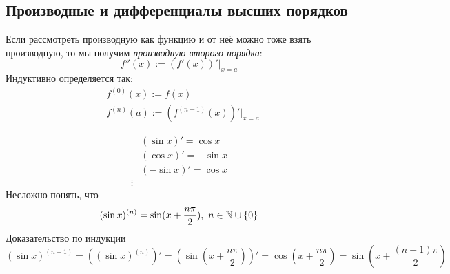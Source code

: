 
\subsection{Производные и дифференциалы высших порядков}

\begin{definition}
	Если рассмотреть производную как функцию и от неё можно тоже взять производную, то мы получим \textit{производную второго порядка}:
	$$
		f''(x) := (f'(x))' \big|_{x = a}
	$$
	Индуктивно определяется так:
	\begin{align*}
		&f^{(0)}(x) := f(x)
		\\
		&f^{(n)}(a) := (f^{(n - 1)}(x))' \big|_{x = a}
	\end{align*}
\end{definition}

\begin{example}
	\begin{align*}
		&{(\sin x)' = \cos x}
		\\
		&{(\cos x)' = -\sin x}
		\\
		&{(-\sin x)' = \cos x}
		\\
		\vdots
	\end{align*}
	Несложно понять, что
	$$
		(\sin x)^{(n)} = \sin (x + \frac{n\pi}{2}),\ n \in \mathbb{N} \cup \{0\}
	$$
	Доказательство по индукции
	$$
		(\sin x)^{(n + 1)} = \left((\sin x)^{(n)}\right)' = \left(\sin(x + \frac{n\pi}{2})\right)' = \cos(x + \frac{n\pi}{2}) = \sin\left(x + \frac{(n + 1)\pi}{2}\right)
	$$
\end{example}